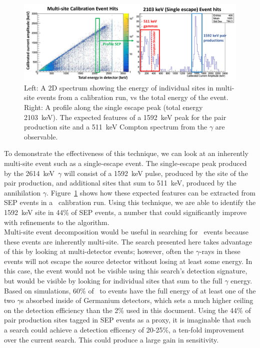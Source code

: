 \documentclass[/main.tex]{subfiles}
\begin{document}
\begin{figure}[h]
  \centering
  \includegraphics[width=\textwidth]{decomposedspectrum}
  \caption[Decomposed SEP spectrum]{\label{fig:eventdecompspectrum}
    Left: A 2D spectrum showing the energy of individual sites in multi-site events from a  calibration run, vs the total energy of the event.\\
    Right: A profile along the single escape peak (total energy 2103~keV). The expected features of a 1592~keV peak for the pair production site and a 511~keV Compton spectrum from the $\gamma$ are observable.
  }
\end{figure}
To demonstrate the effectiveness of this technique, we can look at an inherently multi-site event such as a single-escape event.
The single-escape peak produced by the  2614~keV~$\gamma$ will consist of a 1592~keV pulse, produced by the site of the pair production, and additional sites that sum to 511~keV, produced by the annihilation $\gamma$.
Figure~\ref{fig:eventdecompspectrum} shows how these expected features can be extracted from SEP events in a \MJD\ calibration run.
Using this technique, we are able to identify the 1592~keV site in 44\% of SEP events, a number that could significantly improve with refinements to the algorithm.
\\
Multi-site event decomposition would be useful in searching for \bbes\ events because these events are inherently multi-site.
The search presented here takes advantage of this by looking at multi-detector events; however, often the $\gamma$-rays in these events will not escape the source detector without losing at least some energy.
In this case, the event would not be visible using this search's detection signature, but would be visible by looking for individual sites that sum to the full $\gamma$ energy.
Based on simulations, 60\% of \tnbb\ to  events have the full energy of at least one of the two $\gamma$s absorbed inside of Germanium detectors, which sets a much higher ceiling on the detection efficiency than the 2\% used in this document.
Using the 44\% of pair production sites tagged in SEP events as a proxy, it is imaginable that such a search could achieve a detection efficency of 20-25\%, a ten-fold improvement over the current search.
This could produce a large gain in sensitivity.
\\
\end{document}
